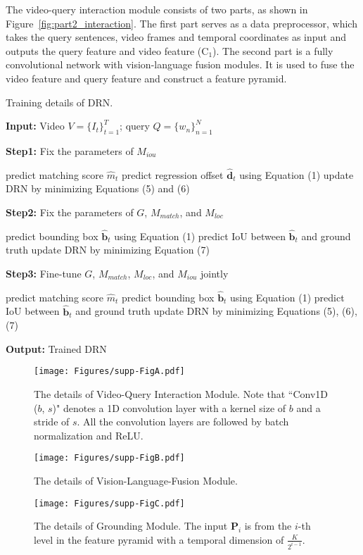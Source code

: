 \documentclass[10pt,twocolumn,letterpaper]{article}
\def\Vec#1{{\boldsymbol{#1}}}
\begin{document}
The video-query interaction module consists of two parts, as shown in Figure~\ref{fig:part2_interaction}. The first part serves as a data preprocessor, which takes the query sentences, video frames and temporal coordinates as input and outputs the query feature and video feature ({C}$_{1}$). The second part is a fully convolutional network with vision-language fusion modules. It is 
used to fuse the video feature and query feature and construct a feature pyramid.
\begin{algorithm}[!t]
	\caption{Training details of DRN.}
\textbf{Input:} Video $V=\{I_{t}\}_{t=1}^T$; query $Q=\{w_n\}_{n=1}^{N}$
	
	\textbf{Step1:} Fix the parameters of $M_{iou}$ 
	\begin{algorithmic}[1]
		\State predict matching score $\hat{{m}}_t$
		\State predict regression offset $\hat{\Vec{d}}_t$ using Equation (1)
		\State update DRN by minimizing Equations (5) and (6)
		\EndWhile
	\end{algorithmic} 
	
	\textbf{Step2:} Fix the parameters of $G$, $M_{match}$, and $M_{loc}$ 
	\begin{algorithmic}[1]
		\State predict bounding box $\hat{\mathbf{b}}_t$ using Equation (1)
		\State predict IoU between $\hat{\mathbf{b}}_{t}$ and ground truth
		\State update DRN by minimizing Equation (7)
		\EndWhile
	\end{algorithmic} 
	
	\textbf{Step3:} Fine-tune $G$, $M_{match}$, $M_{loc}$, and $M_{iou}$ jointly 
	\begin{algorithmic}[1]
		\State predict matching score $\hat{m}_t$
		\State predict bounding box $\hat{\mathbf{b}}_{t}$ using Equation (1)
		\State predict IoU between $\hat{\mathbf{b}}_{t}$ and ground truth
		\State update DRN by minimizing Equations (5), (6), (7)
		\EndWhile
	\end{algorithmic}
	\textbf{Output:} Trained DRN
	
	\label{alg:train}
\end{algorithm}
\vspace{-0.1in}

\begin{figure*}[!t]
	\centering
\texttt{[image: Figures/supp-FigA.pdf]}
	\caption{The details of Video-Query Interaction Module. Note that ``Conv1D ($b$, $s$)" denotes a 1D convolution layer with a kernel size of $b$ and a stride of $s$. All the convolution layers are followed by batch normalization and ReLU.}
	\label{fig:part2_interaction}


	
\centering
	\texttt{[image: Figures/supp-FigB.pdf]}
	\caption{The details of Vision-Language-Fusion Module.}
	\label{fig:vision_language_fusion}
\centering
	\texttt{[image: Figures/supp-FigC.pdf]}
	
	\caption{The details of  Grounding Module. The input $\mathbf{P}_{i}$ is from the $i$-th level in the feature pyramid with a temporal dimension of $\frac{K}{2^{i-1}}$.}
	\label{fig:ground_module}
\end{figure*}
\end{document}
